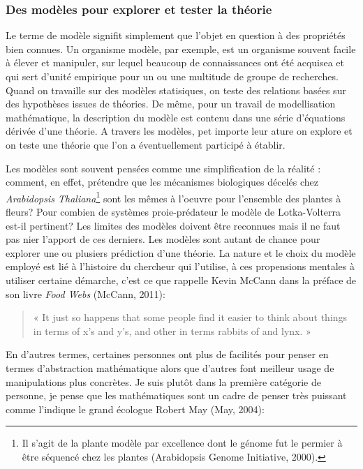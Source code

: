 \subsubsection*{Des modèles pour explorer et tester la
théorie}\label{des-moduxe8les-pour-explorer-et-tester-la-thuxe9orie}

Le terme de modèle signifit simplement que l'objet en question à des
propriétés bien connues. Un organisme modèle, par exemple, est un
organisme souvent facile à élever et manipuler, sur lequel beaucoup de
connaissances ont été acquisea et qui sert d'unité empirique pour un ou
une multitude de groupe de recherches. Quand on travaille sur des
modèles statisiques, on teste des relations basées sur des hypothèses
issues de théories. De même, pour un travail de modellisation
mathématique, la description du modèle est contenu dans une série
d'équations dérivée d'une théorie. A travers les modèles, pet importe
leur ature on explore et on teste une théorie que l'on a éventuellement
participé à établir.

Les modèles sont souvent pensées comme une simplification de la réalité
: comment, en effet, prétendre que les mécanismes biologiques décelés
chez \emph{Arabidopsis Thaliana}\footnote{Il s'agit de la plante modèle
  par excellence dont le génome fut le permier à être séquencé chez les
  plantes (Arabidopsis Genome Initiative, 2000).} sont les mêmes à
l'oeuvre pour l'ensemble des plantes à fleurs? Pour combien de systèmes
proie-prédateur le modèle de Lotka-Volterra est-il pertinent? Les
limites des modèles doivent être reconnues mais il ne faut pas nier
l'apport de ces derniers. Les modèles sont autant de chance pour
explorer une ou plusiers prédiction d'une théorie. La nature et le choix
du modèle employé est lié à l'histoire du chercheur qui l'utilise, à ces
propensions mentales à utiliser certaine démarche, c'est ce que rappelle
Kevin McCann dans la préface de son livre \emph{Food Webs} (McCann,
2011):

\begin{quote}
« It just so happens that some people find it easier to think about
things in terms of x's and y's, and other in terms rabbits of and lynx.
»
\end{quote}

En d'autres termes, certaines personnes ont plus de facilités pour
penser en termes d'abstraction mathématique alors que d'autres font
meilleur usage de manipulations plus concrètes. Je suis plutôt dans la
première catégorie de personne, je pense que les mathématiques sont un
cadre de penser très puissant comme l'indique le grand écologue Robert
May (May, 2004):

